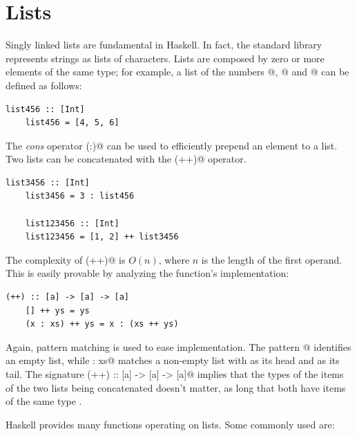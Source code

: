 \documentclass[UdineBachThesis,american,11pt]{PhdThesis}
\begin{document}
  \section{Lists}

  Singly linked lists are fundamental in Haskell. In fact, the standard library
  represents strings as lists of characters. Lists are composed by zero or more
  elements of the same type; for example, a list of the numbers @,
  @ and @ can be defined as follows:

  \pagebreak

  \begin{lstlisting}[gobble=4,basicstyle=\ttfamily\small]
    list456 :: [Int]
    list456 = [4, 5, 6]
  \end{lstlisting}

  The \emph{cons} operator \lstinline@(:)@ can be used to efficiently prepend an
  element to a list. Two lists can be concatenated with the \lstinline@(++)@
  operator.

  \begin{lstlisting}[gobble=4,basicstyle=\ttfamily\small]
    list3456 :: [Int]
    list3456 = 3 : list456

    list123456 :: [Int]
    list123456 = [1, 2] ++ list3456
  \end{lstlisting}

  The complexity of \lstinline@(++)@ is
  $O\mathopen{}\left(n\right)\mathclose{}$, where $n$ is the length of the first
  operand. This is easily provable by analyzing the function's implementation:

  \begin{lstlisting}[gobble=4,basicstyle=\ttfamily\small]
    (++) :: [a] -> [a] -> [a]
    [] ++ ys = ys
    (x : xs) ++ ys = x : (xs ++ ys)
  \end{lstlisting}

  Again, pattern matching is used to ease implementation. The pattern
  \lstinline@[]@ identifies an empty list, while \lstinline@x : xs@ matches a
  non-empty list with \lstinline@x@ as its head and \lstinline@xs@ as its tail.
  The signature \lstinline@(++) :: [a] -> [a] -> [a]@ implies that the types of
  the items of the two lists being concatenated doesn't matter, as long that
  both have items of the same type \lstinline@a@.

  Haskell provides many functions operating on lists. Some commonly used are:
\end{document}
